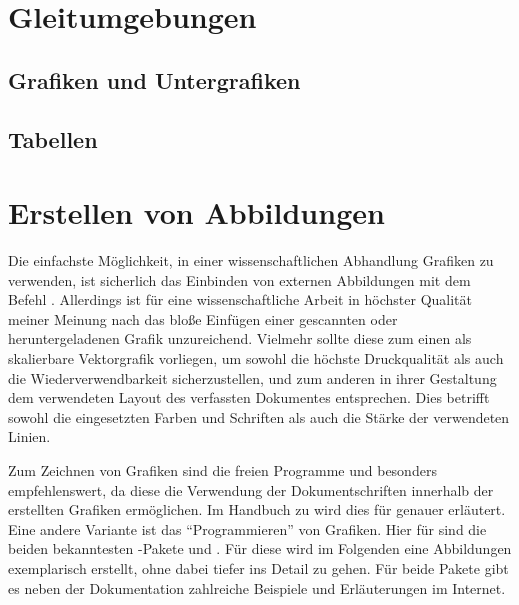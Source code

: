 \documentclass[%
  english,ngerman,%
  geometry=no,DIV=12,automark,%
]{tudscrartcl}
\begin{document}
\section{Gleitumgebungen}
\label{sec:floats}
\subsection{Grafiken und Untergrafiken}
\label{sec:graphics}
\subsection{Tabellen}
\label{sec:tables}


\section{Erstellen von Abbildungen}
\label{sec:figures}
%
Die einfachste Möglichkeit, in einer wissenschaftlichen Abhandlung Grafiken zu 
verwenden, ist sicherlich das Einbinden von externen Abbildungen mit dem Befehl 
. Allerdings ist für eine wissenschaftliche Arbeit in 
höchster Qualität meiner Meinung nach das bloße Einfügen einer gescannten oder 
heruntergeladenen Grafik unzureichend. Vielmehr sollte diese zum einen als 
skalierbare Vektorgrafik vorliegen, um sowohl die höchste Druckqualität als 
auch die Wiederverwendbarkeit sicherzustellen, und zum anderen in ihrer 
Gestaltung dem verwendeten Layout des verfassten Dokumentes entsprechen. Dies 
betrifft sowohl die eingesetzten Farben und Schriften als auch die Stärke der 
verwendeten Linien.

Zum Zeichnen von Grafiken sind die freien Programme  und 
besonders  empfehlenswert, da diese die Verwendung der 
Dokumentschriften innerhalb der erstellten Grafiken ermöglichen. Im Handbuch zu 
\TUDScript wird dies für  genauer erläutert. Eine andere 
Variante ist das \enquote{Programmieren} von Grafiken. Hier für sind die beiden 
bekanntesten -Pakete  und . Für 
diese wird im Folgenden eine Abbildungen exemplarisch erstellt, ohne dabei 
tiefer ins Detail zu gehen. Für beide Pakete gibt es neben der Dokumentation 
zahlreiche Beispiele und Erläuterungen im Internet.
\end{document}
